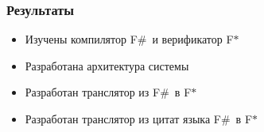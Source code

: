 \documentclass{beamer}
\def \fstar {F$\ast$}
\def \fsharp {F$\#$}
\begin{document}
\begin{frame}
  \transwipe[direction=90]
  \frametitle{Результаты}
  \begin{itemize}
    \item Изучены компилятор \fsharp~и верификатор \fstar
    \item Разработана архитектура системы
    \item Разработан транслятор из \fsharp~в \fstar
    \item Разработан транслятор из цитат языка \fsharp~в \fstar
  \end{itemize}
\end{frame}
\end{document}
